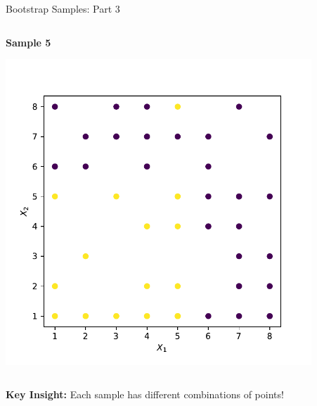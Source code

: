 \documentclass[10pt]{beamer}
\newcommand{\fitpic}[1]{\begin{adjustbox}{max width=\linewidth, max totalheight=0.78\textheight}#1\end{adjustbox}}
\begin{document}
\begin{frame}{Bootstrap Samples: Part 3}
\begin{center}
\begin{columns}
\begin{column}{0.45\textwidth}
\centering
\textbf{Sample 5}

\fitpic{\includegraphics[width = 0.9\textwidth]{../assets/ensemble/figures/dataset-rnd-4}}
\end{column}

\begin{column}{0.45\textwidth}
\centering
\end{column}
\end{columns}
\end{center}

\begin{keypointsbox}
\textbf{Key Insight:} Each sample has different combinations of points!
\end{keypointsbox}
\end{frame}
\end{document}
